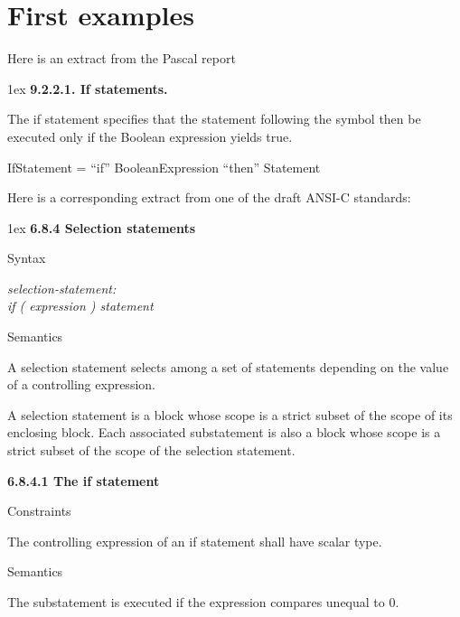 \documentclass[11pt]{book}
\begin{document}
\chapter{First examples}
\setcounter{page}{0}
\pagestyle{headings}
\noindent Here is an extract from the Pascal report\\[2ex]
\begin{boxedminipage}{\textwidth}
\sf\parindent0pt\parskip1ex
{\bfseries 9.2.2.1. If statements. }

The if statement specifies that the statement following the symbol then be executed only if the Boolean expression
yields true. 

IfStatement = ``if'' BooleanExpression ``then'' Statement
\end{boxedminipage}

\vspace*{2ex}

\noindent Here is a corresponding extract from one of the draft ANSI-C standards:\\[2ex]
\begin{boxedminipage}{\textwidth}
\sf\parindent0pt\parskip1ex
{\bfseries 6.8.4 Selection statements}

Syntax

{\em selection-statement:\\\hspace*{2em}
if ( expression ) statement
}

Semantics

A selection statement selects among a set of statements depending on the value of a
controlling expression.

A selection statement is a block whose scope is a strict subset of the scope of its
enclosing block. Each associated substatement is also a block whose scope is a strict
subset of the scope of the selection statement.

{\bfseries 6.8.4.1 The if statement}

Constraints

The controlling expression of an if statement shall have scalar type.

Semantics

The substatement is executed if the expression compares unequal to 0.
\end{boxedminipage}
\clearpage
\end{document}
